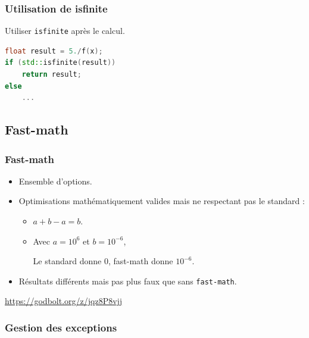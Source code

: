 \documentclass{beamer}
\begin{document}
\begin{frame}[fragile]
    \frametitle{Utilisation de isfinite}

    Utiliser \verb'isfinite' après le calcul.

    \begin{lstlisting}[language=c++]
float result = 5./f(x);
if (std::isfinite(result))
    return result;
else
    ...
    \end{lstlisting}
\end{frame}

\subsection{Fast-math}

\begin{frame}[fragile]
    \frametitle{Fast-math}

    \begin{itemize}
        \item Ensemble d'options.
        \item Optimisations mathématiquement valides mais ne respectant pas le standard :
              \begin{itemize}
                  \item $a+b-a = b$.
                  \item Avec $a = 10^6$ et $b = 10^{-6}$,

                        Le standard donne $0$, fast-math donne $10^{-6}$.
              \end{itemize}
        \item Résultats différents mais pas plus faux que sans \verb'fast-math'.
    \end{itemize}

    \url{https://godbolt.org/z/jqz8P8vjj}
\end{frame}

\subsubsection{Gestion des exceptions}
\end{document}
